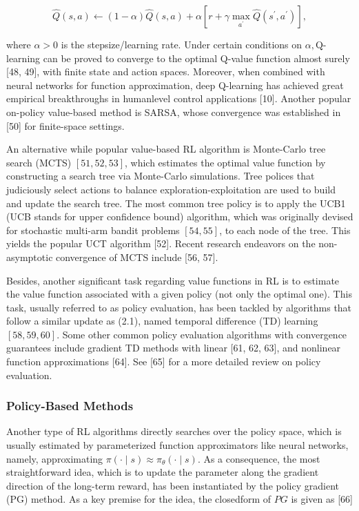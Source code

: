 \documentclass[10pt]{article}
\begin{document}
\[
\hat{Q}(s, a) \leftarrow(1-\alpha) \hat{Q}(s, a)+\alpha\left[r+\gamma \max _{a^{\prime}} \hat{Q}\left(s^{\prime}, a^{\prime}\right)\right],
\]

where $\alpha>0$ is the stepsize/learning rate. Under certain conditions on $\alpha, \mathrm{Q}$-learning can be proved to converge to the optimal Q-value function almost surely [48, 49], with finite state and action spaces. Moreover, when combined with neural networks for function approximation, deep Q-learning has achieved great empirical breakthroughs in humanlevel control applications [10]. Another popular on-policy value-based method is SARSA, whose convergence was established in [50] for finite-space settings.

An alternative while popular value-based RL algorithm is Monte-Carlo tree search (MCTS) $[51,52,53]$, which estimates the optimal value function by constructing a search tree via Monte-Carlo simulations. Tree polices that judiciously select actions to balance exploration-exploitation are used to build and update the search tree. The most common tree policy is to apply the UCB1 (UCB stands for upper confidence bound) algorithm, which was originally devised for stochastic multi-arm bandit problems $[54,55]$, to each node of the tree. This yields the popular UCT algorithm [52]. Recent research endeavors on the non-asymptotic convergence of MCTS include [56, 57].

Besides, another significant task regarding value functions in RL is to estimate the value function associated with a given policy (not only the optimal one). This task, usually referred to as policy evaluation, has been tackled by algorithms that follow a similar update as (2.1), named temporal difference (TD) learning $[58,59,60]$. Some other common policy evaluation algorithms with convergence guarantees include gradient TD methods with linear [61, 62, 63], and nonlinear function approximations [64]. See [65] for a more detailed review on policy evaluation.

\subsubsection{Policy-Based Methods}
Another type of RL algorithms directly searches over the policy space, which is usually estimated by parameterized function approximators like neural networks, namely, approximating $\pi(\cdot \mid s) \approx \pi_{\theta}(\cdot \mid s)$. As a consequence, the most straightforward idea, which is to update the parameter along the gradient direction of the long-term reward, has been instantiated by the policy gradient (PG) method. As a key premise for the idea, the closedform of $P G$ is given as [66]
\end{document}
